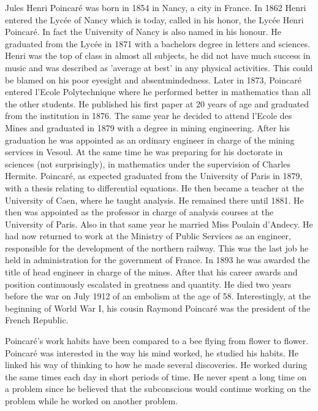Jules Henri Poincar\'{e} was born in 1854 in Nancy, a city in France. In 1862 Henri entered the Lyc\'{e}e of Nancy which is today, called in his honor, the Lyc\'{e}e Henri Poincar\'{e}. In fact the University of Nancy is also named in his honour. He graduated from the Lyc\'{e}e in 1871 with a bachelors degree in letters and sciences. Henri was the top of class in almost all subjects, he did not have much success in music and was described as 'average at best' in any physical activities. This could be blamed on his poor eyesight and absentmindedness. Later in 1873, Poincar\'{e} entered l'Ecole Polytechnique where he performed better in mathematics than all the other students. He published his first paper at 20 years of age and graduated from the institution in 1876. The same year he decided to attend l'Ecole des Mines and graduated in 1879 with a degree in mining engineering. After his graduation he was appointed as an ordinary engineer in charge of the mining services in Vesoul. At the same time he was preparing for his doctorate in sciences (not surprisingly), in mathematics under the supervision of Charles Hermite. Poincar\'{e}, as expected graduated from the University of Paris in 1879, with a thesis relating to differential equations. He then became a teacher at the University of Caen, where he taught analysis. He remained there until 1881. He then was appointed as the professor in charge of analysis courses at the University of Paris. Also in that same year he married Miss Poulain d'Andecy. He had now returned to work at the Ministry of Public Services as an engineer, responsible for the development of the northern railway. This was the last job he held in administration for the government of France. In 1893 he was awarded the title of head engineer in charge of the mines. After that his career awards and position continuously escalated in greatness and quantity. He died two years before the war on July 1912 of an embolism at the age of 58. Interestingly, at the beginning of World War I, his cousin Raymond Poincar\'{e} was the president of the French Republic.

Poincar\'{e}'s work habits have been compared to a bee flying from flower to flower. Poincar\'{e} was interested in the way his mind worked, he studied his habits. He linked his way of thinking to how he made several discoveries. He worked during the same times each day in short periods of time. He never spent a long time on a problem since he believed that the subconscious would continue working on the problem while he worked on another problem. 

